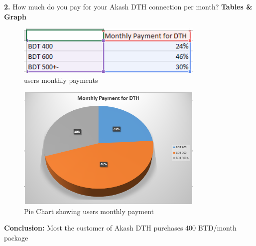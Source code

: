 \begin{spacing}{1}
{\bf 2.} How much do you pay for your Akash DTH connection per month?\newline
{\bf Tables \& Graph}\newline
\begin{figure}[H]
	\centering
	\includegraphics[width=0.8\textwidth]{fig2_1}
	\caption{users monthly payments}
	\label{fig:Table1}
\end{figure}
\begin{figure}[H]
	\centering
	\includegraphics[width=0.8\textwidth]{fig2_2}
	\caption{Pie Chart showing users monthly payment}
	\label{fig:pieChar2}
\end{figure}
{\bf Conclusion: }\newline
Most the customer of Akash DTH purchases 400 BTD/month package


\end{spacing}
